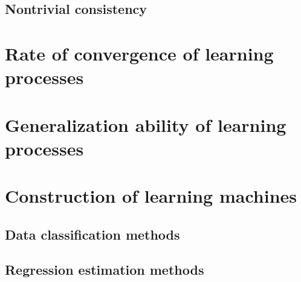 \subsection{Nontrivial consistency}


\section{Rate of convergence of learning processes}

\section{Generalization ability of learning processes}

\section{Construction of learning machines}

\subsection{Data classification methods}

\subsection{Regression estimation methods}
